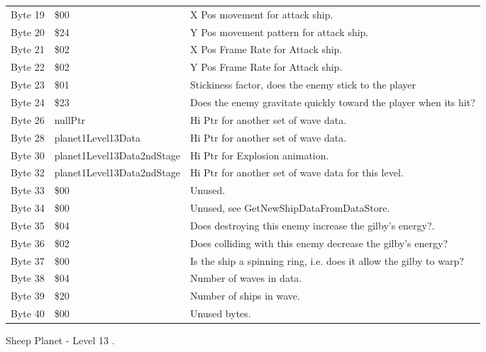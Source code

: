 \begin{figure}[H]
{\begin{adjustbox}{width=12cm}
\begin{tabular}{lll}
 Byte 19 & \$00                        & X Pos movement for attack ship.                                    \\
 Byte 20 & \$24                        & Y Pos movement pattern for attack ship.                            \\
 Byte 21 & \$02                        & X Pos Frame Rate for Attack ship.                                  \\
 Byte 22 & \$02                        & Y Pos Frame Rate for Attack ship.                                  \\
 Byte 23 & \$01                        & Stickiness factor, does the enemy stick to the player              \\
 Byte 24 & \$23                        & Does the enemy gravitate quickly toward the player when its hit?   \\
 Byte 26 & nullPtr                    & Hi Ptr for another set of wave data.                               \\
 Byte 28 & planet1Level13Data         & Hi Ptr for another set of wave data.                               \\
 Byte 30 & planet1Level13Data2ndStage & Hi Ptr for Explosion animation.                                    \\
 Byte 32 & planet1Level13Data2ndStage & Hi Ptr for another set of wave data for this level.                \\
 Byte 33 & \$00                        & Unused.                                                            \\
 Byte 34 & \$00                        & Unused, see GetNewShipDataFromDataStore.                           \\
 Byte 35 & \$04                        & Does destroying this enemy increase the gilby's energy?.           \\
 Byte 36 & \$02                        & Does colliding with this enemy decrease the gilby's energy?        \\
 Byte 37 & \$00                        & Is the ship a spinning ring, i.e. does it allow the gilby to warp? \\
 Byte 38 & \$04                        & Number of waves in data.                                           \\
 Byte 39 & \$20                        & Number of ships in wave.                                           \\
 Byte 40 & \$00                        & Unused bytes.                                                      \\
\bottomrule
\end{tabular}

  \end{adjustbox}

  }\caption*{Sheep Planet - Level 13
.}
\end{figure}


